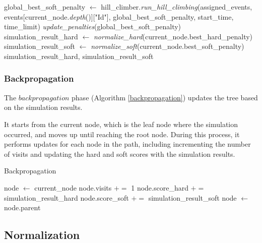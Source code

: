 \begin{algorithm}
\begin{algorithmic}[1]
            \State global\_best\_soft\_penalty $\gets$ hill\_climber.\textit{run\_hill\_climbing}(assigned\_events, 
            \Statex \hspace{3cm} events[current\_node.\textit{depth}()]["Id"], 
            \Statex \hspace{3cm} global\_best\_soft\_penalty, start\_time, time\_limit)
            \State \textit{update\_penalties}(global\_best\_soft\_penalty)
        \EndIf
    \EndIf
    \\
    \State simulation\_result\_hard $\gets$ \textit{normalize\_hard}(current\_node.best\_hard\_penalty)
    \State simulation\_result\_soft $\gets$ \textit{normalize\_soft}(current\_node.best\_soft\_penalty)
    \\
    \State \Return simulation\_result\_hard, simulation\_result\_soft
\EndFunction
\end{algorithmic}
\end{algorithm}

\subsubsection{Backpropagation}

The \(backpropagation\) phase (Algorithm \ref{backpropagation}) updates the tree based on the simulation results. 

It starts from the current node, which is the leaf node where the simulation occurred, and moves up until reaching the root node. During this process, it performs updates for each node in the path, including incrementing the number of visits and updating the hard and soft scores with the simulation results. 

\begin{algorithm}
\caption{Backpropagation}\label{backpropagation}
\begin{algorithmic}[1]
    \State node $\gets$ current\_node
        \State node.visits $+=$ 1
        \State node.score\_hard $+=$ simulation\_result\_hard
        \State node.score\_soft $+=$ simulation\_result\_soft
        \State node $\gets$ node.parent
    \EndWhile
\EndFunction
\end{algorithmic}
\end{algorithm}

\subsection{Normalization}

